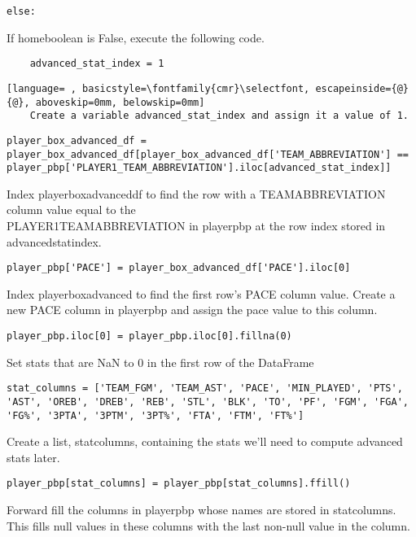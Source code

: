 \documentclass{article}
\begin{document}
\begin{lstlisting}
else:
\end{lstlisting}
If home\textunderscore boolean is False, execute the following code.
\begin{lstlisting}
    advanced_stat_index = 1
\end{lstlisting}
\begin{lstlisting}[language= , basicstyle=\fontfamily{cmr}\selectfont, escapeinside={@}{@}, aboveskip=0mm, belowskip=0mm]
    Create a variable advanced_stat_index and assign it a value of 1.
\end{lstlisting}
\begin{lstlisting}
player_box_advanced_df = player_box_advanced_df[player_box_advanced_df['TEAM_ABBREVIATION'] == player_pbp['PLAYER1_TEAM_ABBREVIATION'].iloc[advanced_stat_index]]
\end{lstlisting}
Index player\textunderscore box\textunderscore advanced\textunderscore df to find the row with a TEAM\textunderscore ABBREVIATION column value equal to the\\ PLAYER1\textunderscore TEAM\textunderscore ABBREVIATION in player\textunderscore pbp at the row index stored in advanced\textunderscore stat\textunderscore index.
\begin{lstlisting}
player_pbp['PACE'] = player_box_advanced_df['PACE'].iloc[0]
\end{lstlisting}
Index player\textunderscore box\textunderscore advanced to find the first row's PACE column value. Create a new PACE column in player\textunderscore pbp and assign the pace value to this column. 
\begin{lstlisting}
player_pbp.iloc[0] = player_pbp.iloc[0].fillna(0)
\end{lstlisting}
Set stats that are NaN to 0 in the first row of the DataFrame
\begin{lstlisting}
stat_columns = ['TEAM_FGM', 'TEAM_AST', 'PACE', 'MIN_PLAYED', 'PTS', 'AST', 'OREB', 'DREB', 'REB', 'STL', 'BLK', 'TO', 'PF', 'FGM', 'FGA', 'FG%', '3PTA', '3PTM', '3PT%', 'FTA', 'FTM', 'FT%']
\end{lstlisting}
Create a list, stat\textunderscore columns, containing the stats we'll need to compute advanced stats later.
\begin{lstlisting}
player_pbp[stat_columns] = player_pbp[stat_columns].ffill()
\end{lstlisting}
Forward fill the columns in player\textunderscore pbp whose names are stored in stat\textunderscore columns. This fills null values in these columns with the last non-null value in the column.
\end{document}
